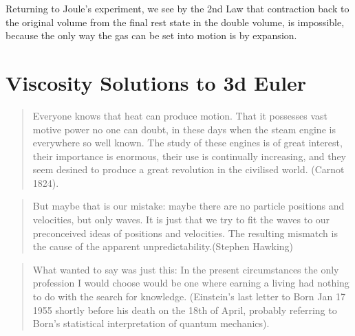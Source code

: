 Returning to Joule's experiment, we see by the 2nd Law that contraction back
to the original volume from the final rest state in the double volume,
is impossible, because the only way the gas can be set into motion is 
by expansion.



 


\chapter{Viscosity Solutions to 3d Euler}

\small
\begin{quote} Everyone knows that heat can produce motion. That it possesses
vast motive power no one can doubt, in these days when the steam engine is 
everywhere so well known. The study of these engines is of great interest,
their importance is enormous, their use is continually increasing, and they
seem desined to produce a great revolution in the civilised world.
(Carnot \cite{carnot} 1824).
\end{quote}
\begin{quote} But maybe that is our mistake: 
maybe there are no particle positions and velocities, but only waves. 
It is just that we try to fit the waves to our preconceived ideas of 
positions and velocities. The resulting mismatch is the cause of the 
apparent unpredictability.(Stephen Hawking)
\end{quote}
\begin{quote}
What  wanted to say was just this: In the present
circumstances the only profession I would choose would be one where
earning a living had nothing to do with the search for knowledge.
(Einstein's last letter to Born Jan 17 1955 shortly before his death on 
the 18th of April, 
probably referring to Born's  statistical interpretation 
of quantum mechanics).
\end{quote} 

